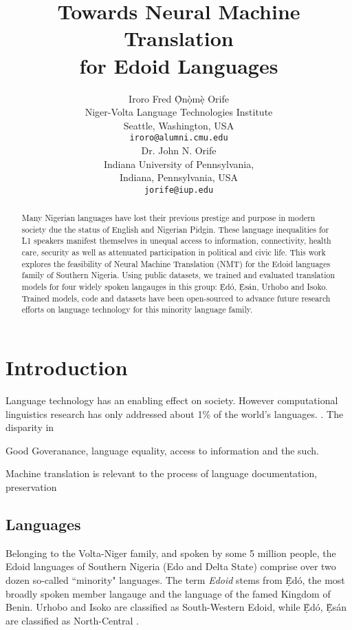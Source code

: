 \documentclass{article} %
\title{Towards Neural Machine Translation \\ for Edoid Languages}
\author{Iroro Fred \d{\`O}n\d{\`o}m\d{\`e} Orife \\
Niger-Volta Language Technologies Institute\\
Seattle, Washington, USA \\
\texttt{iroro@alumni.cmu.edu} \\
\And
Dr. John N. Orife\\
Indiana University of Pennsylvania, \\
Indiana, Pennsylvania, USA \\
\texttt{jorife@iup.edu} \\
}
\begin{document}
\maketitle

\begin{abstract}
Many Nigerian languages have lost their previous prestige and purpose in modern society due the status of English and Nigerian Pidgin. These language inequalities for L1 speakers manifest themselves in unequal access to information, connectivity, health care, security as well as attenuated participation in political and civic life. This work explores the feasibility of Neural Machine Translation (NMT) for the Edoid languages family of Southern Nigeria. Using public datasets, we trained and evaluated translation models for four widely spoken langauges in this group: \d{\`E}d{\'o}, \d{\`E}s{\'a}n, Urhobo and Isoko. Trained models, code and datasets have been open-sourced to advance future research efforts on language technology for this minority language family.\\


\end{abstract}

\section{Introduction}

Language technology has an enabling effect on society. However computational linguistics research has only addressed about 1\% of the world's languages. \citep{bird2012machine}. The disparity in 

\citep{odoje201612}

Good Goveranance, language equality, access to information and the such.

Machine translation  is relevant to the process of language documentation, preservation

\subsection{Languages}
Belonging to the Volta-Niger family, and spoken by some 5 million people, the Edoid languages of Southern Nigeria (Edo and Delta State) comprise over two dozen so-called ``minority" languages. The term \emph{Edoid} stems from \d{\`E}d{\'o}, the most broadly spoken member langauge and the language of the famed Kingdom of Benin. Urhobo and Isoko are classified as South-Western Edoid, while \d{\`E}d{\'o}, \d{\`E}s{\'a}n are classified as North-Central \citep{wikiedoid}.
\end{document}
